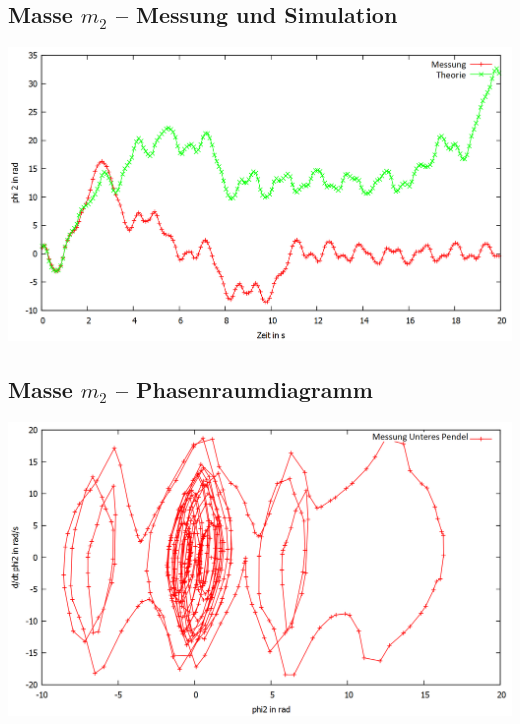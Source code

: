 \subsection*{Masse $m_2$ -- Messung und Simulation}
\begin{frame}
	\includegraphics[width=\textwidth]{images/4/phi2uebert}
\end{frame}

\subsection*{Masse $m_2$ -- Phasenraumdiagramm}
\begin{frame}
	\includegraphics[width=\textwidth]{images/4/phi2_ueberphi2}
\end{frame}

\begin{frame}
\end{frame}
